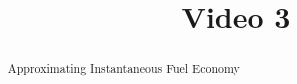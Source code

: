 \documentclass[handout]{ximera}
\title{Video 3}
\begin{document}
\begin{abstract}
Approximating Instantaneous Fuel Economy
\end{abstract}

\maketitle

\end{document}
